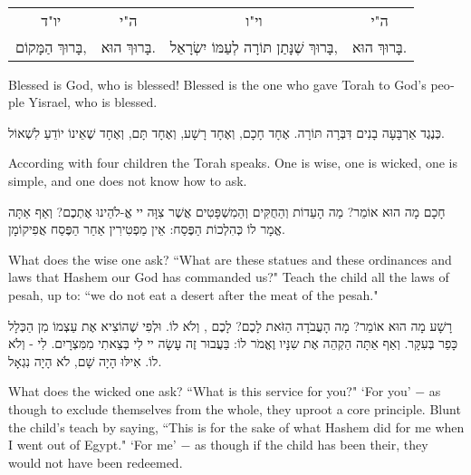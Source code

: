 \ \\

\begin{tabular}{c c c c}
{\small \instructionfont
יו"ד
} & {\small \instructionfont
ה"י
} & {\small \instructionfont
וי"ו
} & {\small \instructionfont
ה"י 
} \\
בָּרוּךְ הַמָּקוֹם, 
& בָּרוּךְ הוּא. 
& בָּרוּךְ שֶׁנָּתַן תּוֹרָה לְעַמּוֹ יִשְׂרָאֵל, 
& בָּרוּךְ הוּא. \\
\end{tabular}

\begin{english}
Blessed is God, who is blessed! Blessed is the one who gave Torah to God's people Yisrael, who is blessed.
\end{english}

\break

כְּנֶגֶד אַרְבָּעָה בָנִים דִּבְּרָה תּוֹרָה. אֶחָד חָכָם, וְאֶחָד רָשָׁע, וְאֶחָד תָּם, וְאֶחָד שֶׁאֵינוֹ יוֹדֵעַ לִשְׁאוֹל.

\begin{english}
According with four children the Torah speaks. One is wise, one is wicked, one is simple, and one does not know how to ask.
\end{english}

חָכָם מָה הוּא אוֹמֵר? מַה הָעֵדוֹת וְהַחֻקִּים וְהַמִשְׁפָּטִים אֲשֶׁר צִוָּה יי אֱ-לֹהֵינוּ אֶתְכֶם? וְאַף אַתָּה אֱמָר לוֹ כְּהִלְכוֹת הַפֶּסַח: אֵין מַפְטִירִין אַחַר הַפֶּסַח אֲפִיקוֹמָן.

\begin{english}
What does the wise one ask? ``What are these statues and these ordinances and laws that Hashem our God has commanded us?" Teach the child all the laws of pesah, up to: ``we do not eat a desert after the meat of the pesah."
\end{english}

רָשָׁע מָה הוּא אוֹמֵר? מָה הָעֲבֹדָה הַזֹּאת לָכֶם? לָכֶם , וְלֹא לוֹ. וּלְפִי שֶׁהוֹצִיא אֶת עַצְמוֹ מִן הַכְּלָל כָּפַר בְּעִקָּר. וְאַף אַתָּה הַקְהֵה אֶת שִנָּיו וֶאֱמֹר לוֹ: בַּעֲבוּר זֶה עָשָׂה יי לִי בְּצֵאתִי מִמִּצְרָיִם. לִי - וְלֹא לוֹ. אִילּוּ הָיָה שָׁם, לֹא הָיָה נִגְאָל.

\begin{english}
What does the wicked one ask? ``What is this service for you?" `For you' $-$ as though to exclude themselves from the whole, they uproot a core principle. Blunt the child's teach by saying, ``This is for the sake of what Hashem did for me when I went out of Egypt." `For me' $-$ as though if the child has been their, they would not have been redeemed.
\end{english}

